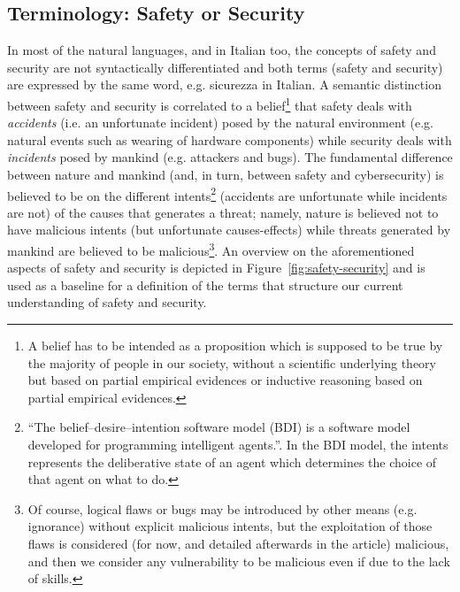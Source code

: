 \subsection{Terminology: Safety or Security}\label{sec:sicurezza}
In most of the natural languages, and in Italian too, the concepts of safety
and security are not syntactically differentiated and both terms (safety and
security) are expressed by the same word, e.g. sicurezza in Italian.  A
semantic distinction between safety and security is correlated to a
belief\footnote{A belief has to be intended as a proposition which is supposed
to be true by the majority of people in our society, without a scientific
underlying theory but based on partial empirical evidences or inductive reasoning based on partial empirical evidences.} that
safety deals with \emph{accidents} (i.e. an unfortunate incident) posed by the
natural environment (e.g. natural events such as wearing of hardware
components) while security deals with \emph{incidents} posed by mankind (e.g.
attackers and bugs).  The fundamental difference between nature and mankind (and,
in turn, between safety and cybersecurity) is believed to be on the different
intents\footnote{``The belief–desire–intention software model (BDI) is a
software model developed for programming intelligent
agents.''\autocite{wiki-bdi}. In the BDI model, the intents represents the
deliberative state of an agent which determines the choice of that agent on
what to do.} (accidents are unfortunate while incidents are not) of the causes
that generates a threat; namely, nature is believed not to have malicious
intents (but unfortunate causes-effects) while threats generated by mankind are
believed to be malicious\footnote{Of course, logical flaws or bugs may be
introduced by other means (e.g. ignorance) without explicit malicious intents,
but the exploitation of those flaws is considered (for now, and detailed
afterwards in the article) malicious, and then we consider any vulnerability to
be malicious even if due to the lack of skills.}.
An overview on the aforementioned aspects of safety and security is depicted in
Figure~\ref{fig:safety-security} and is used as a baseline for a definition of
the terms that structure our current understanding of safety and security. 

